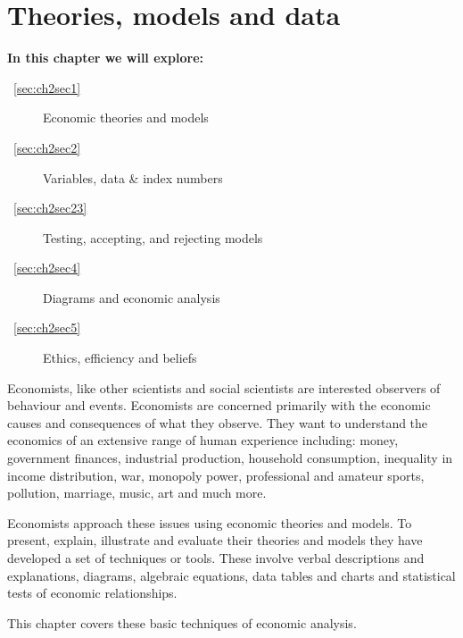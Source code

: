 \chapter{Theories, models and data} \label{chap:tmd}

\begin{topics}
\textbf{In this chapter we will explore:}
\begin{description}
\item [~\ref{sec:ch2sec1}] Economic theories and models
\item [~\ref{sec:ch2sec2}] Variables, data \& index numbers
\item [~\ref{sec:ch2sec23}] Testing, accepting, and rejecting models
\item [~\ref{sec:ch2sec4}] Diagrams and economic analysis
\item [~\ref{sec:ch2sec5}] Ethics, efficiency and beliefs
\end{description}
\end{topics}

Economists, like other scientists and social scientists are interested observers of behaviour and events. Economists are concerned primarily with the economic causes and consequences of what they observe. They want to understand the economics of an extensive range of human experience including: money, government finances, industrial production, household consumption, inequality in income distribution, war, monopoly power, professional and amateur sports, pollution, marriage, music, art and much more.

Economists approach these issues using economic theories and models. To present, explain, illustrate and evaluate their theories and models they have developed a set of techniques or tools. These involve verbal descriptions and explanations, diagrams, algebraic equations, data tables and charts and statistical tests of economic relationships.

This chapter covers these basic techniques of economic analysis.
